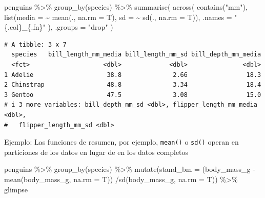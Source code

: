 \documentclass[
  letterpaper,
  DIV=11,
  numbers=noendperiod]{scrreprt}
\newenvironment{Shaded}{\begin{snugshade}}{\end{snugshade}}
\newcommand{\AttributeTok}[1]{\textcolor[rgb]{0.40,0.45,0.13}{#1}}
\newcommand{\FunctionTok}[1]{\textcolor[rgb]{0.28,0.35,0.67}{#1}}
\newcommand{\NormalTok}[1]{\textcolor[rgb]{0.00,0.23,0.31}{#1}}
\newcommand{\SpecialCharTok}[1]{\textcolor[rgb]{0.37,0.37,0.37}{#1}}
\newcommand{\StringTok}[1]{\textcolor[rgb]{0.13,0.47,0.30}{#1}}
\begin{document}
\begin{Shaded}
\begin{Highlighting}[]
\NormalTok{penguins }\SpecialCharTok{\%\textgreater{}\%}
  \FunctionTok{group\_by}\NormalTok{(species) }\SpecialCharTok{\%\textgreater{}\%}
  \FunctionTok{summarise}\NormalTok{(}
    \FunctionTok{across}\NormalTok{(}
      \FunctionTok{contains}\NormalTok{(}\StringTok{"mm"}\NormalTok{),}
      \FunctionTok{list}\NormalTok{(}\AttributeTok{media =} \SpecialCharTok{\textasciitilde{}} \FunctionTok{mean}\NormalTok{(., }\AttributeTok{na.rm =}\NormalTok{ T), }\AttributeTok{sd =} \SpecialCharTok{\textasciitilde{}} \FunctionTok{sd}\NormalTok{(., }\AttributeTok{na.rm =}\NormalTok{ T)),}
      \AttributeTok{.names =} \StringTok{"\{.col\}\_\{.fn\}"}
\NormalTok{    ),}
    \AttributeTok{.groups =} \StringTok{"drop"}
\NormalTok{  )}
\end{Highlighting}
\end{Shaded}

\begin{verbatim}
# A tibble: 3 x 7
  species   bill_length_mm_media bill_length_mm_sd bill_depth_mm_media
  <fct>                    <dbl>             <dbl>               <dbl>
1 Adelie                    38.8              2.66                18.3
2 Chinstrap                 48.8              3.34                18.4
3 Gentoo                    47.5              3.08                15.0
# i 3 more variables: bill_depth_mm_sd <dbl>, flipper_length_mm_media <dbl>,
#   flipper_length_mm_sd <dbl>
\end{verbatim}

{Ejemplo}: Las funciones de resumen, por ejemplo, \texttt{mean()} o
\texttt{sd()} operan en particiones de los datos en lugar de en los
datos completos

\begin{Shaded}
\begin{Highlighting}[]
\NormalTok{penguins }\SpecialCharTok{\%\textgreater{}\%}
  \FunctionTok{group\_by}\NormalTok{(species) }\SpecialCharTok{\%\textgreater{}\%} 
  \FunctionTok{mutate}\NormalTok{(}\AttributeTok{stand\_bm =}\NormalTok{ (body\_mass\_g }\SpecialCharTok{{-}} \FunctionTok{mean}\NormalTok{(body\_mass\_g, }\AttributeTok{na.rm =}\NormalTok{ T))}
         \SpecialCharTok{/}\FunctionTok{sd}\NormalTok{(body\_mass\_g, }\AttributeTok{na.rm =}\NormalTok{ T)) }\SpecialCharTok{\%\textgreater{}\%} 
\NormalTok{  glimpse}
\end{Highlighting}
\end{Shaded}
\end{document}

